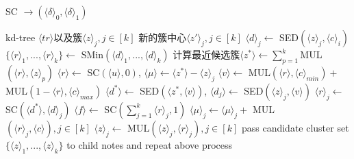 \begin{algorithm}[htbp]
    \renewcommand{\algorithmicrequire}{\textbf{输入:}}
    \renewcommand{\algorithmicensure}{\textbf{输出:}}
    \caption{SC $\rightarrow (\langle \delta \rangle_0, \langle \delta \rangle_1)$}
    \label{alg_sf}
    \begin{algorithmic}[1]
        \REQUIRE kd-tree $\langle tr \rangle$以及簇$\langle z \rangle_j, j\in[k]$
        \ENSURE 新的簇中心$\langle z'\rangle_j,j\in[k]$
        \STATE $\langle d \rangle_j \leftarrow$ SED$(\langle z \rangle_j, \langle c \rangle_i)$ %
        \ENDFOR
        \STATE $\{\langle r\rangle_1,...,\langle r\rangle_k\} \leftarrow$ SMin$(\langle d \rangle_1,...,\langle d \rangle_k)$
        \STATE 计算最近候选簇$\langle z^* \rangle \leftarrow \sum_{p=1}^k$MUL$(\langle r \rangle,\langle z\rangle_p)$ %
        \STATE $\langle r \rangle \leftarrow$ SC$(\langle u \rangle, 0)$, $\langle \mu \rangle \leftarrow \langle z^{*} \rangle - \langle z\rangle_j$%
        \STATE $\langle v \rangle \leftarrow$ MUL$(\langle r\rangle, \langle c \rangle_{min})+ $MUL$(1-\langle r\rangle,\langle c\rangle_{max})$
        \STATE $\langle d^{*}\rangle \leftarrow$ SED$(\langle z^{*}, \langle v \rangle)$, $\langle d_j \rangle \leftarrow$ SED$(\langle z\rangle_j,\langle v\rangle)$ %
        \STATE $\langle r\rangle_j \leftarrow$ SC$(\langle d^{*}\rangle, \langle d\rangle_j)$
        \ENDFOR
        \STATE $\langle f \rangle \leftarrow$ SC$(\sum_{j=1}^{k}\langle r\rangle_j, 1)$
        \STATE $\langle \mu \rangle_j \leftarrow \langle \mu \rangle_j +$ MUL$(\langle r\rangle_j, \langle c \rangle),j\in[k]$ %
        \ELSE
        \STATE $\langle z \rangle_j \leftarrow$ MUL$(\langle z \rangle_j, \langle r\rangle_j), j\in[k]$
        \STATE pass candidate cluster set $\{\langle z \rangle_1,...,\langle z\rangle_k\}$ to child notes and repeat above process
        \ENDIF
        \ENDFOR

    \end{algorithmic}
\end{algorithm}

